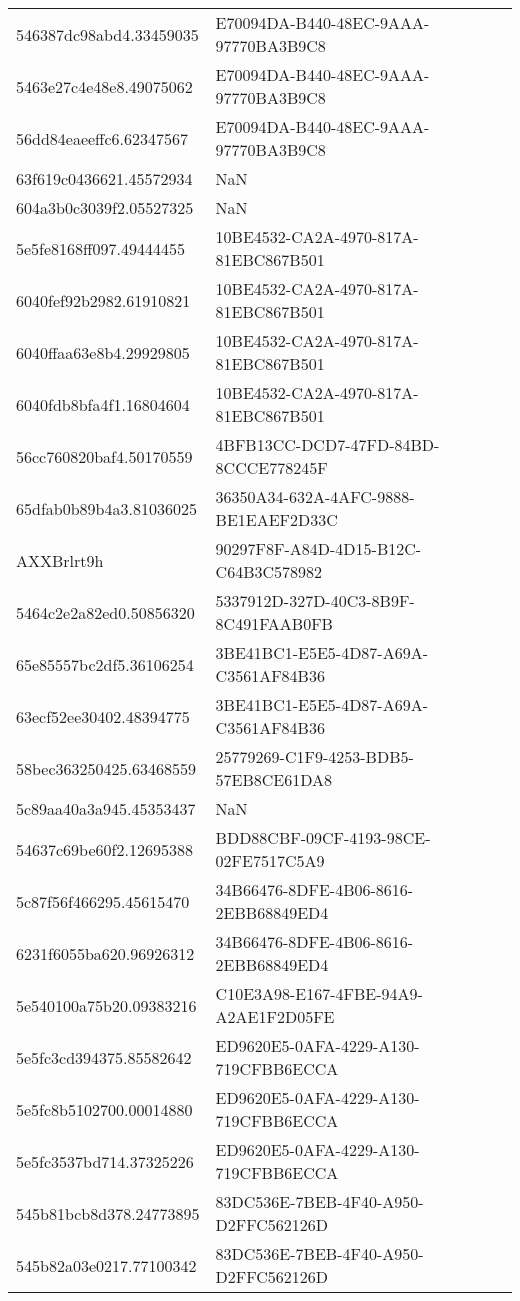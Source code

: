 \begin{tabular}{ll}
546387dc98abd4.33459035 & E70094DA-B440-48EC-9AAA-97770BA3B9C8 \\
5463e27c4e48e8.49075062 & E70094DA-B440-48EC-9AAA-97770BA3B9C8 \\
56dd84eaeeffc6.62347567 & E70094DA-B440-48EC-9AAA-97770BA3B9C8 \\
63f619c0436621.45572934 & NaN \\
604a3b0c3039f2.05527325 & NaN \\
5e5fe8168ff097.49444455 & 10BE4532-CA2A-4970-817A-81EBC867B501 \\
6040fef92b2982.61910821 & 10BE4532-CA2A-4970-817A-81EBC867B501 \\
6040ffaa63e8b4.29929805 & 10BE4532-CA2A-4970-817A-81EBC867B501 \\
6040fdb8bfa4f1.16804604 & 10BE4532-CA2A-4970-817A-81EBC867B501 \\
56cc760820baf4.50170559 & 4BFB13CC-DCD7-47FD-84BD-8CCCE778245F \\
65dfab0b89b4a3.81036025 & 36350A34-632A-4AFC-9888-BE1EAEF2D33C \\
AXXBrlrt9h & 90297F8F-A84D-4D15-B12C-C64B3C578982 \\
5464c2e2a82ed0.50856320 & 5337912D-327D-40C3-8B9F-8C491FAAB0FB \\
65e85557bc2df5.36106254 & 3BE41BC1-E5E5-4D87-A69A-C3561AF84B36 \\
63ecf52ee30402.48394775 & 3BE41BC1-E5E5-4D87-A69A-C3561AF84B36 \\
58bec363250425.63468559 & 25779269-C1F9-4253-BDB5-57EB8CE61DA8 \\
5c89aa40a3a945.45353437 & NaN \\
54637c69be60f2.12695388 & BDD88CBF-09CF-4193-98CE-02FE7517C5A9 \\
5c87f56f466295.45615470 & 34B66476-8DFE-4B06-8616-2EBB68849ED4 \\
6231f6055ba620.96926312 & 34B66476-8DFE-4B06-8616-2EBB68849ED4 \\
5e540100a75b20.09383216 & C10E3A98-E167-4FBE-94A9-A2AE1F2D05FE \\
5e5fc3cd394375.85582642 & ED9620E5-0AFA-4229-A130-719CFBB6ECCA \\
5e5fc8b5102700.00014880 & ED9620E5-0AFA-4229-A130-719CFBB6ECCA \\
5e5fc3537bd714.37325226 & ED9620E5-0AFA-4229-A130-719CFBB6ECCA \\
545b81bcb8d378.24773895 & 83DC536E-7BEB-4F40-A950-D2FFC562126D \\
545b82a03e0217.77100342 & 83DC536E-7BEB-4F40-A950-D2FFC562126D \\

\end{tabular}
